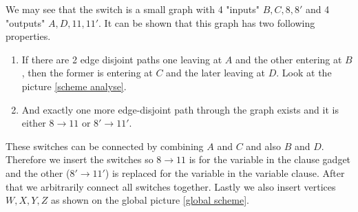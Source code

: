 We may see that the switch is a small graph with 4 "inputs" $B, C, 8, 8'$ and 4 "outputs" $A, D, 11, 11'$. It can be shown that this graph has two following properties.

\begin{enumerate}
	\item If there are 2 edge disjoint paths one leaving at \textcolor{myorange}{$A$} and the other entering at \textcolor{myblue}{$B$}, then the former is entering at \textcolor{myorange}{$C$} and the later leaving at \textcolor{myblue}{$D$}. Look at the picture \ref{scheme analyse}.
	\item And exactly one more edge-disjoint path through the graph exists and it is either $8 \to 11$ or $8' \to 11'$.
\end{enumerate}

These switches can be connected by combining $A$ and $C$ and also $B$ and $D$. Therefore we insert the switches so $8 \to 11$ is for the variable in the clause gadget and the other ($8' \to 11'$) is replaced for the variable in the variable clause. After that we arbitrarily connect all switches together. Lastly we also insert vertices \textcolor{myviolet}{$W, X, Y, Z$} as shown on the global picture \ref{global scheme}.

